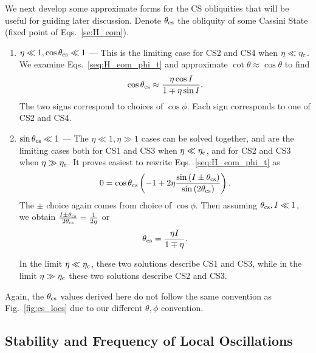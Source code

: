\documentclass[
        fleqn,
        usenatbib,
    ]{mnras}
\newcommand*{\p}[1]{\left(#1\right)}
\begin{document}
We next develop some approximate forms for the CS obliquities that will be
useful for guiding later discussion. Denote $\theta_{\rm cs}$ the obliquity of
some Cassini State (fixed point of Eqs.~\eqref{se:H_eom}).
\begin{enumerate}
    \item $\eta \ll 1, \cos \theta_{\rm cs} \ll 1$ --- This is the limiting case
        for CS2 and CS4 when $\eta \ll \eta_{\rm c}$. We examine
        Eqs.~\eqref{seq:H_eom_phi_t} and approximate $\cot \theta \approx \cos
        \theta$ to find
        \begin{equation}
            \cos \theta_{\rm cs} \approx \frac{\eta \cos I}
                {1 \mp \eta \sin I}.
        \end{equation}
        The two signs correspond to choices of $\cos \phi$. Each sign
        corresponds to one of CS2 and CS4.

    \item $\sin \theta_{\rm cs} \ll 1$ --- The $\eta \ll 1, \eta \gg 1$ cases
        can be solved together, and are the limiting cases both for CS1 and CS3
        when $\eta \ll \eta_{\rm c}$, and for CS2 and CS3 when $\eta \gg
        \eta_{\rm c}$. It proves easiest to rewrite Eqs.~\eqref{seq:H_eom_phi_t}
        as
        \begin{equation}
            0 = \cos \theta_{\rm cs}\p{-1 + 2\eta
                \frac{\sin \p{I \pm \theta_{\rm cs}}}{\sin \p{2\theta_{\rm
                    cs}}}}.\label{eq:rewritten_dphi}
        \end{equation}
        The $\pm$ choice again comes from choice of $\cos \phi$. Then assuming
        $\theta_{\rm cs}, I \ll 1$, we obtain $\frac{I \pm
        \theta_{\rm cs}}{2\theta_{\rm cs}} = \frac{1}{2\eta}$ or
        \begin{equation}
            \theta_{\rm cs} = \frac{\eta I}{1 \mp \eta}.
        \end{equation}

        In the limit $\eta \ll \eta_{\rm c}$, these two solutions describe CS1
        and CS3, while in the limit $\eta \gg \eta_{\rm c}$ these two solutions
        describe CS2 and CS3.
\end{enumerate}
Again, the $\theta_{\rm cs}$ values derived here do not follow the same
convention as Fig.~\ref{fig:cs_locs} due to our different $\theta, \phi$
convention.

\subsection{Stability and Frequency of Local Oscillations}\label{ss:eigens}
\end{document}

